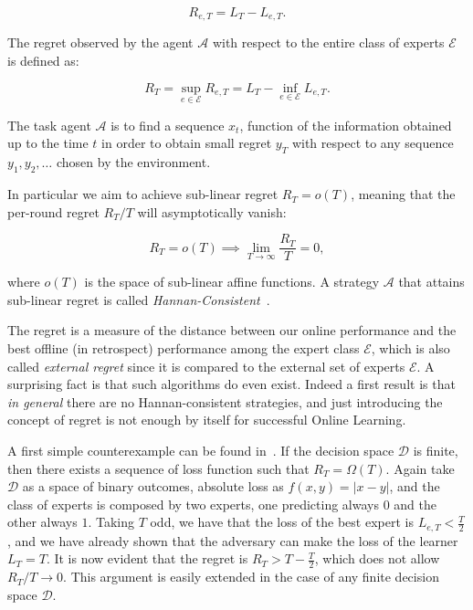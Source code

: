 \begin{equation}\label{def:Regret}
	R_{e,T} = L_T-L_{e,T}.
\end{equation}

The regret observed by the agent $\mathcal A$ with respect to the entire class of experts $\mathcal E$ is defined as:

\begin{equation}
	R_T=\sup\limits_{e\in\mathcal E}R_{e,T}=L_T-\inf\limits_{e\in\mathcal E}L_{e,T}.
\end{equation}

The task agent $\mathcal A$ is to find a sequence $x_t$, function of the information obtained up to the time $t$ in order to obtain small regret $y_T$ with respect to any sequence $y_1,y_2,\ldots$ chosen by the environment.

In particular we aim to achieve sub-linear regret $R_T= o(T)$, meaning that the per-round regret $R_T/T$ will asymptotically vanish: 

\begin{equation}
	R_T= o(T) \implies \lim\limits_{T\to \infty}\frac{R_T}{T}=0,
\end{equation}

where $ o(T)$ is the space of sub-linear affine functions. A strategy $\mathcal A$ that attains sub-linear regret is called \emph{Hannan-Consistent}~\cite{hannan1957approximation}.

The regret is a measure of the distance between our online performance and the best offline (in retrospect) performance among the expert class $\mathcal E$, which is also called \emph{external regret} since it is compared to the external set of experts $\mathcal E$. A surprising fact is that such algorithms do even exist.
Indeed a first result is that \emph{in general} there are no Hannan-consistent strategies, and just introducing the concept of regret is not enough by itself for successful Online Learning. 

A first simple counterexample can be found in~\cite{cover1966behavior}. If the decision space $\mathcal D$ is finite, then there exists a sequence of loss function such that $R_T=\Omega(T)$.
Again take $\mathcal D$ as a space of binary outcomes, absolute loss as $f(x,y)=|x - y|$, and the class of experts is composed by two experts, one predicting always $0$ and the other always $1$. Taking $T$ odd, we have that the loss of the best expert is $L_{e,T}<\frac{T}{2}$, and we have already shown that the adversary can make the loss of the learner $L_T=T$. It is now evident that the regret is $R_T>T-\frac{T}{2}$, which does not allow $R_T/T\to 0$. This argument is easily extended in the case of any finite decision space $\mathcal D$.

